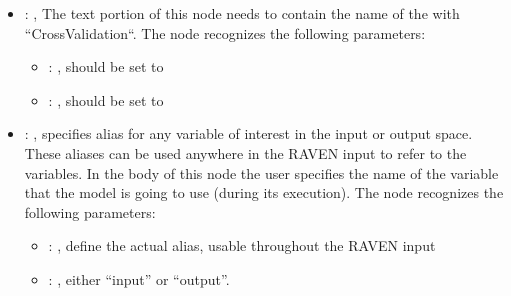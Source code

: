 \begin{itemize}
\begin{itemize}
        \item {}: ,
          List of IDs of features/variables to include in the transformation process.

        \item {}: ,
          Which space to search? Target or Feature?
      \end{itemize}

    \item {}: ,
      The text portion of this node needs to contain the name of the  with
               ``CrossValidation``.
      The  node recognizes the following parameters:
        \begin{itemize}
          \item {}: ,
            should be set to 
          \item {}: ,
            should be set to 
      \end{itemize}

    \item {}: ,
      specifies alias for         any variable of interest in the input or output space. These
      aliases can be used anywhere in the RAVEN input to         refer to the variables. In the body
      of this node the user specifies the name of the variable that the model is going to use
      (during its execution).
      The  node recognizes the following parameters:
        \begin{itemize}
          \item {}: ,
            define the actual alias, usable throughout the RAVEN input
          \item {}: ,
            either ``input'' or ``output''.
      \end{itemize}


\end{itemize}
